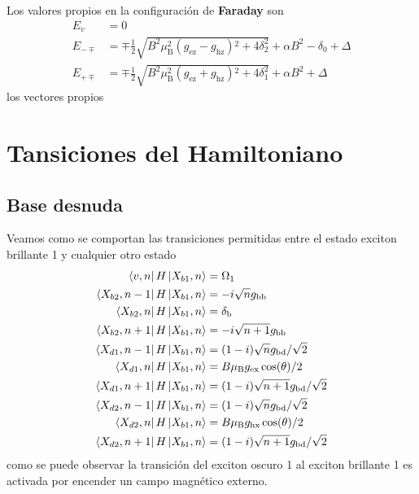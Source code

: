 \documentclass[../main.tex]{subfiles}
\begin{document}
Los valores propios en la configuración de \textbf{Faraday} son
\begin{align*}
    E_v &= 0\\
    E_{-\mp} &= \mp\frac{1}{2} \sqrt{B^2 \mu _{\text{B}}^2 \left(g_{\text{ez}}-g_{\text{hz}}\right){}^2+4 \delta _2^2}+\alpha  B^2-\delta _0+\Delta\\
    E_{+\mp} &= \mp\frac{1}{2} \sqrt{B^2 \mu _{\text{B}}^2 \left(g_{\text{ez}}+g_{\text{hz}}\right){}^2+4 \delta _1^2}+\alpha  B^2+\Delta
\end{align*}
los vectores propios
\chapter{Tansiciones del Hamiltoniano}
\section{Base desnuda}
Veamos como se comportan las transiciones permitidas entre el estado exciton brillante 1 y cualquier otro estado
\begin{align*}
    \bra{v,n}H\ket{X_{b1},n} &= \Omega_1\\
    \bra{X_{b2},n-1}H\ket{X_{b1},n} &= -i \sqrt{n} g_\text{bb}\\
    \bra{X_{b2},n}H\ket{X_{b1},n} &= \delta_\text{b}\\
    \bra{X_{b2},n+1}H\ket{X_{b1},n} &= -i \sqrt{n+1} g_\text{bb}\\
    \bra{X_{d1},n-1}H\ket{X_{b1},n} &= (1-i)\sqrt{n} g_\text{bd}/\sqrt{2}\\
    \bra{X_{d1},n}H\ket{X_{b1},n} &= B \mu_\text{B} g_\text{ex} \cos(\theta)/2\\
    \bra{X_{d1},n+1}H\ket{X_{b1},n} &= (1-i)\sqrt{n+1}g_\text{bd}/\sqrt{2}\\
    \bra{X_{d2},n-1}H\ket{X_{b1},n} &= (1-i)\sqrt{n} g_\text{bd}/\sqrt{2}\\
    \bra{X_{d2},n}H\ket{X_{b1},n} &= B \mu_\text{B} g_\text{hx} \cos(\theta)/2\\
    \bra{X_{d2},n+1}H\ket{X_{b1},n} &= (1-i)\sqrt{n+1}g_\text{bd}/\sqrt{2}
\end{align*}
como se puede observar la transición del exciton oscuro 1 al exciton brillante 1 es activada por encender un campo magnético externo.
\end{document}
